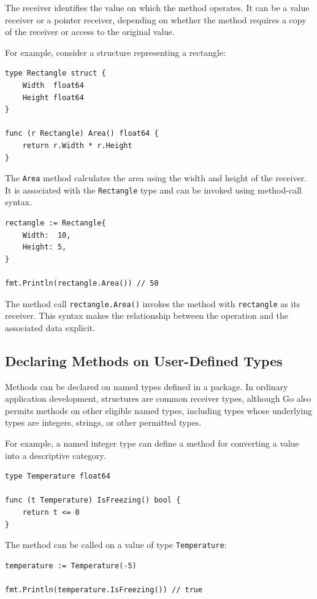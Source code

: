 The receiver identifies the value on which the method operates. It can be a value receiver or a pointer receiver, depending on whether the method requires a copy of the receiver or access to the original value.

For example, consider a structure representing a rectangle:

\begin{lstlisting}
type Rectangle struct {
    Width  float64
    Height float64
}

func (r Rectangle) Area() float64 {
    return r.Width * r.Height
}
\end{lstlisting}

The \texttt{Area} method calculates the area using the width and height of the receiver. It is associated with the \texttt{Rectangle} type and can be invoked using method-call syntax.

\begin{lstlisting}
rectangle := Rectangle{
    Width:  10,
    Height: 5,
}

fmt.Println(rectangle.Area()) // 50
\end{lstlisting}

The method call \texttt{rectangle.Area()} invokes the method with \texttt{rectangle} as its receiver. This syntax makes the relationship between the operation and the associated data explicit.

\subsection{Declaring Methods on User-Defined Types}

Methods can be declared on named types defined in a package. In ordinary application development, structures are common receiver types, although Go also permits methods on other eligible named types, including types whose underlying types are integers, strings, or other permitted types.

For example, a named integer type can define a method for converting a value into a descriptive category.

\begin{lstlisting}
type Temperature float64

func (t Temperature) IsFreezing() bool {
    return t <= 0
}
\end{lstlisting}

The method can be called on a value of type \texttt{Temperature}:

\begin{lstlisting}
temperature := Temperature(-5)

fmt.Println(temperature.IsFreezing()) // true
\end{lstlisting}

